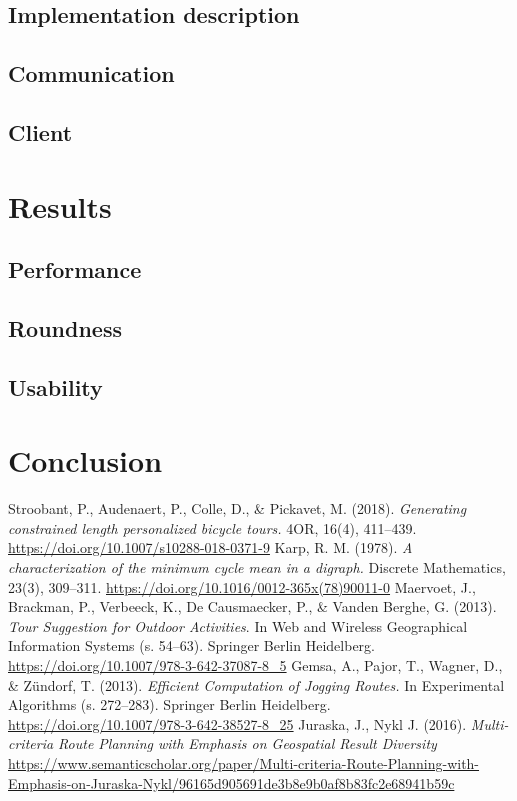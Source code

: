\documentclass{ctuthesis}
\begin{document}
\section{Implementation description}
\section{Communication}
\section{Client}

\chapter{Results}
\section{Performance}
\section{Roundness}
\section{Usability}



\chapter{Conclusion}

\begin{thebibliography}{1}
	Stroobant, P., Audenaert, P., Colle, D., \& Pickavet, M. (2018). \emph{Generating constrained length personalized bicycle tours.} 4OR, 16(4), 411–439. \url{https://doi.org/10.1007/s10288-018-0371-9} 
	Karp, R. M. (1978). \emph{A characterization of the minimum cycle mean in a digraph.} Discrete Mathematics, 23(3), 309–311. \url{https://doi.org/10.1016/0012-365x(78)90011-0} 
	Maervoet, J., Brackman, P., Verbeeck, K., De Causmaecker, P., \& Vanden Berghe, G. (2013). \emph{Tour Suggestion for Outdoor Activities}. In Web and Wireless Geographical Information Systems (s. 54–63). Springer Berlin Heidelberg. \url{https://doi.org/10.1007/978-3-642-37087-8_5} 
	Gemsa, A., Pajor, T., Wagner, D., \& Zündorf, T. (2013). \emph{Efficient Computation of Jogging Routes.} In Experimental Algorithms (s. 272–283). Springer Berlin Heidelberg. \url{https://doi.org/10.1007/978-3-642-38527-8_25} 
	 Juraska, J., Nykl J. (2016). \emph{Multi-criteria Route Planning with Emphasis on Geospatial Result Diversity} \url{https://www.semanticscholar.org/paper/Multi-criteria-Route-Planning-with-Emphasis-on-Juraska-Nykl/96165d905691de3b8e9b0af8b83fc2e68941b59c}
\end{thebibliography}
\end{document}
